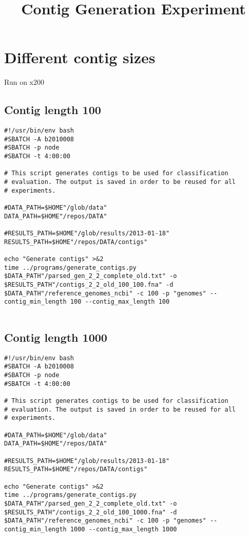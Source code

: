 \documentclass[12pt]{article}
\begin{document}
\title {Contig Generation Experiment}

\maketitle
\section*{Different contig sizes}
Run on x200
\subsection*{Contig length 100}
\begin{lstlisting}[breaklines]
#!/usr/bin/env bash
#SBATCH -A b2010008
#SBATCH -p node
#SBATCH -t 4:00:00

# This script generates contigs to be used for classification 
# evaluation. The output is saved in order to be reused for all 
# experiments.

#DATA_PATH=$HOME"/glob/data"
DATA_PATH=$HOME"/repos/DATA"

#RESULTS_PATH=$HOME"/glob/results/2013-01-18"
RESULTS_PATH=$HOME"/repos/DATA/contigs"

echo "Generate contigs" >&2
time ../programs/generate_contigs.py $DATA_PATH"/parsed_gen_2_2_complete_old.txt" -o $RESULTS_PATH"/contigs_2_2_old_100_100.fna" -d $DATA_PATH"/reference_genomes_ncbi" -c 100 -p "genomes" --contig_min_length 100 --contig_max_length 100


\end{lstlisting}
\subsection*{Contig length 1000}
\begin{lstlisting}[breaklines]
#!/usr/bin/env bash
#SBATCH -A b2010008
#SBATCH -p node
#SBATCH -t 4:00:00

# This script generates contigs to be used for classification 
# evaluation. The output is saved in order to be reused for all 
# experiments.

#DATA_PATH=$HOME"/glob/data"
DATA_PATH=$HOME"/repos/DATA"

#RESULTS_PATH=$HOME"/glob/results/2013-01-18"
RESULTS_PATH=$HOME"/repos/DATA/contigs"

echo "Generate contigs" >&2
time ../programs/generate_contigs.py $DATA_PATH"/parsed_gen_2_2_complete_old.txt" -o $RESULTS_PATH"/contigs_2_2_old_100_1000.fna" -d $DATA_PATH"/reference_genomes_ncbi" -c 100 -p "genomes" --contig_min_length 1000 --contig_max_length 1000

\end{lstlisting}
\end{document}

